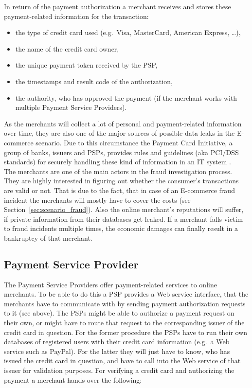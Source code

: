 In return of the payment authorization a merchant receives and stores these  payment-related information for the transaction:\@

\begin{itemize}
		\item the type of credit card used (e.g.\ Visa, MasterCard, American Express, \ldots),
		\item the name of the credit card owner,
		\item the unique payment token received by the \gls{PSP},
		\item the timestamps and result code of the authorization,
		\item the authority, who has approved the payment (if the merchant works with multiple Payment Service Providers).
\end{itemize}

As the merchants will collect a lot of personal and payment-related information over time, they are also one of the major sources of possible data leaks in the \gls{E-commerce} scenario. Due to this circumstance the Payment Card Initiative, a group of banks, issuers and \gls{PSP}s, provides rules and guidelines (aka \gls{PCI/DSS} standards) for securely handling these kind of information in an \gls{IT} system \citep{virtue2009payment}. \\

The merchants are one of the main actors in the fraud investigation process. They are highly interested in figuring out whether the consumer's transactions are valid or not. That is due to the fact, that in case of an \gls{E-commerce} fraud incident the merchants will mostly have to cover the costs (see Section~\ref{sec:scenario_fraud}). Also the online merchant's reputations will suffer, if private information from their databases get leaked. If a merchant falls victim to fraud incidents multiple times, the economic damages can finally result in a bankruptcy of that merchant.


\subsection{Payment Service Provider}
\label{subsec:stakeholder_psp}

The Payment Service Providers offer payment-related services to online merchants. To be able to do this a \gls{PSP} provides a Web service interface, that the merchants have to communicate with by sending payment authorization requests to it (see above). The \gls{PSP}s might be able to authorize a payment request on their own, or might have to route that request to the corresponding issuer of the credit card in question. For the former procedure the \gls{PSP}s have to run their own databases of registered users with their credit card information (e.g.\ a Web service such as PayPal). For the latter they will just have to know, who has issued the credit card in question, and have to call into the Web service of that issuer for validation purposes. For verifying a credit card and authorizing the payment a merchant hands over the following:\@

